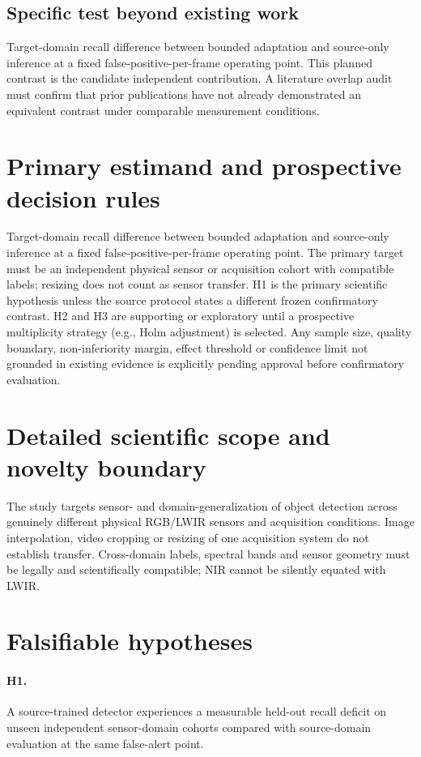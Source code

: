 \documentclass[11pt,a4paper]{article}
\begin{document}
\subsection{Specific test beyond existing work}
Target-domain recall difference between bounded adaptation and source-only inference at a fixed false-positive-per-frame operating point. This planned contrast is the candidate independent contribution. A literature overlap audit must confirm that prior publications have not already demonstrated an equivalent contrast under comparable measurement conditions.

\section{Primary estimand and prospective decision rules}
Target-domain recall difference between bounded adaptation and source-only inference at a fixed false-positive-per-frame operating point. The primary target must be an independent physical sensor or acquisition cohort with compatible labels; resizing does not count as sensor transfer. H1 is the primary scientific hypothesis unless the source protocol states a different frozen confirmatory contrast. H2 and H3 are supporting or exploratory until a prospective multiplicity strategy (e.g., Holm adjustment) is selected. Any sample size, quality boundary, non-inferiority margin, effect threshold or confidence limit not grounded in existing evidence is explicitly pending approval before confirmatory evaluation.

\section{Detailed scientific scope and novelty boundary}
The study targets sensor- and domain-generalization of object detection across genuinely different physical RGB/LWIR sensors and acquisition conditions. Image interpolation, video cropping or resizing of one acquisition system do not establish transfer. Cross-domain labels, spectral bands and sensor geometry must be legally and scientifically compatible; NIR cannot be silently equated with LWIR.

\section{Falsifiable hypotheses}
\paragraph{H1.} A source-trained detector experiences a measurable held-out recall deficit on unseen independent sensor-domain cohorts compared with source-domain evaluation at the same false-alert point.
\end{document}
